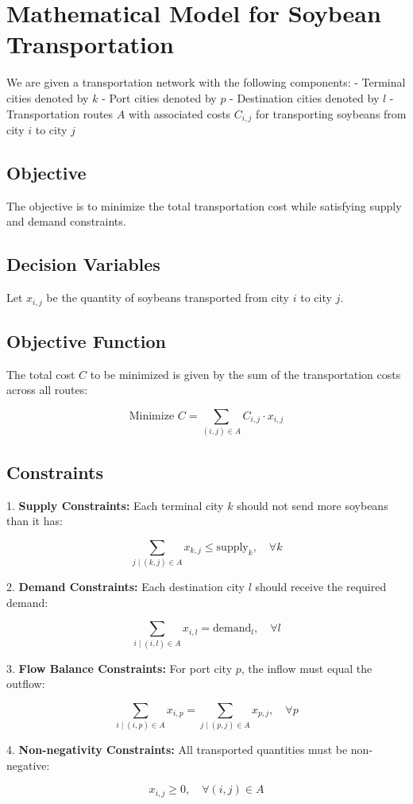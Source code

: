 \documentclass{article}
\begin{document}
\section*{Mathematical Model for Soybean Transportation}

We are given a transportation network with the following components: 
- Terminal cities denoted by $k$
- Port cities denoted by $p$
- Destination cities denoted by $l$
- Transportation routes $A$ with associated costs $C_{i,j}$ for transporting soybeans from city $i$ to city $j$

\subsection*{Objective}
The objective is to minimize the total transportation cost while satisfying supply and demand constraints.

\subsection*{Decision Variables}
Let $x_{i,j}$ be the quantity of soybeans transported from city $i$ to city $j$.

\subsection*{Objective Function}

The total cost $C$ to be minimized is given by the sum of the transportation costs across all routes:

\[
\text{Minimize } C = \sum_{(i,j) \in A} C_{i,j} \cdot x_{i,j}
\]

\subsection*{Constraints}

1. \textbf{Supply Constraints:} Each terminal city $k$ should not send more soybeans than it has:

\[
\sum_{j \mid (k, j) \in A} x_{k,j} \leq \text{supply}_{k}, \quad \forall k
\]

2. \textbf{Demand Constraints:} Each destination city $l$ should receive the required demand:

\[
\sum_{i \mid (i, l) \in A} x_{i,l} = \text{demand}_{l}, \quad \forall l
\]

3. \textbf{Flow Balance Constraints: } For port city $p$, the inflow must equal the outflow:

\[
\sum_{i \mid (i, p) \in A} x_{i,p} = \sum_{j \mid (p, j) \in A} x_{p,j}, \quad \forall p
\]

4. \textbf{Non-negativity Constraints: } All transported quantities must be non-negative:

\[
x_{i,j} \geq 0, \quad \forall (i,j) \in A
\]
\end{document}
